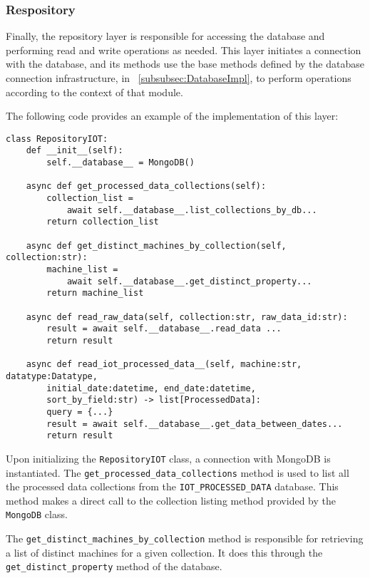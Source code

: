 \subsubsection{Respository}\label{subsubsec:repository}
Finally, the repository layer is responsible for accessing the database and performing read and write operations as needed. This layer initiates a connection with the database, and its methods use the base methods defined by the database connection infrastructure, in ~\ref{subsubsec:DatabaseImpl}, to perform operations according to the context of that module.

The following code provides an example of the implementation of this layer:

\begin{Verbatim}[fontsize=\small, baselinestretch=0.6]
class RepositoryIOT:
    def __init__(self):
        self.__database__ = MongoDB()
    
    async def get_processed_data_collections(self):
        collection_list = 
            await self.__database__.list_collections_by_db...
        return collection_list
        
    async def get_distinct_machines_by_collection(self, collection:str):
        machine_list = 
            await self.__database__.get_distinct_property...
        return machine_list
    
    async def read_raw_data(self, collection:str, raw_data_id:str):
        result = await self.__database__.read_data ...
        return result
    
    async def read_iot_processed_data__(self, machine:str, datatype:Datatype, 
        initial_date:datetime, end_date:datetime, 
        sort_by_field:str) -> list[ProcessedData]:
        query = {...}
        result = await self.__database__.get_data_between_dates...
        return result
\end{Verbatim}

Upon initializing the \texttt{RepositoryIOT} class, a connection with MongoDB is instantiated. The \texttt{get\_processed\_data\_collections} method is used to list all the processed data collections from the \texttt{IOT\_PROCESSED\_DATA} database. This method makes a direct call to the collection listing method provided by the \texttt{MongoDB} class.

The \texttt{get\_distinct\_machines\_by\_collection} method is responsible for retrieving a list of distinct machines for a given collection. It does this through the \texttt{get\_distinct\_property} method of the database.

